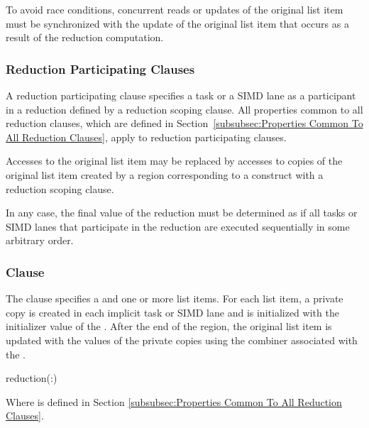 To avoid race conditions, concurrent reads or updates of the original list item
must be synchronized with the update of the original list item that occurs as a
result of the reduction computation.










\subsubsection{Reduction Participating Clauses}
\label{subsubsec:Reduction Participating Clauses}
A reduction participating clause specifies a task or a SIMD lane as a
participant in a reduction defined by a reduction scoping clause.
All properties common to all reduction clauses, which are defined in
Section~\ref{subsubsec:Properties Common To All Reduction Clauses}, apply to
reduction participating clauses.

Accesses to the original list item may be replaced by accesses to copies of the
original list item created by a region corresponding to a construct with a
reduction scoping clause.

In any case, the final value of the reduction must be determined as if all tasks
or SIMD lanes that participate in the reduction are executed sequentially in
some arbitrary order.










\subsubsection{ Clause}
\label{subsubsec:reduction clause}
\summary
The  clause specifies a  and one or
more list items. For each list item, a private copy is created in each implicit
task or SIMD lane and is initialized with the initializer value of the
. After the end of the region, the original list item
is updated with the values of the private copies using the combiner associated
with the .

\syntax
\begin{ompSyntax}
reduction(:)
\end{ompSyntax}
Where  is defined in Section
\ref{subsubsec:Properties Common To All Reduction Clauses}.

